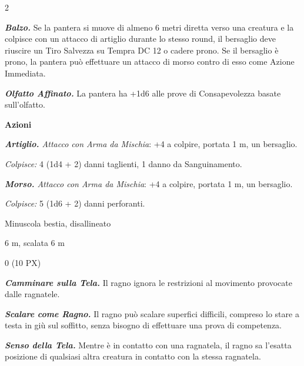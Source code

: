 \begin{multicols}{2}
{\emph{\textbf{Balzo.}} Se la pantera si muove di almeno 6 metri diretta verso una creatura e la colpisce con un attacco di artiglio durante lo stesso round, il bersaglio deve riuscire un Tiro Salvezza su Tempra DC 12 o cadere prono. Se il bersaglio è prono, la pantera può effettuare un attacco di morso contro di esso come Azione Immediata.

\emph{\textbf{Olfatto Affinato.}} La pantera ha +1d6 alle prove di Consapevolezza basate sull'olfatto.

\textbf{Azioni}

\emph{\textbf{Artiglio.} Attacco con Arma da Mischia}: +4 a colpire, portata 1 m, un bersaglio.

\emph{Colpisce:} 4 (1d4 + 2) danni taglienti, 1 danno da Sanguinamento.

\emph{\textbf{Morso.} Attacco con Arma da Mischia}: +4 a colpire, portata 1 m, un bersaglio.

\emph{Colpisce:} 5 (1d6 + 2) danni perforanti.

\begin{description}[noitemsep, topsep=0pt, parsep=0pt, partopsep=0pt, itemsep=1pt, leftmargin=2.35cm,  labelwidth=2.2cm, itemindent=0cm, listparindent=0pt] %
\setlength{\baselineskip}{10pt}
\item[\textbf{Taglia/Tipo}] Minuscola bestia, disallineato
\item[\textbf{Caratt.}] 
\item[\textbf{Punti Ferita}] 
\item[\textbf{Tiri Salvez.}] 
\item[\textbf{Movimento}] 6 m, scalata 6 m
\item[\textbf{Sfida}] 0 (10 PX)
\end{description}
\smallskip

\emph{\textbf{Camminare sulla Tela.}} Il ragno ignora le restrizioni al movimento provocate dalle ragnatele.

\emph{\textbf{Scalare come Ragno.}} Il ragno può scalare superfici difficili, compreso lo stare a testa in giù sul soffitto, senza bisogno di effettuare una prova di competenza.

\emph{\textbf{Senso della Tela.}} Mentre è in contatto con una ragnatela, il ragno sa l'esatta posizione di qualsiasi altra creatura in contatto con la stessa ragnatela.

}
\end{multicols}
